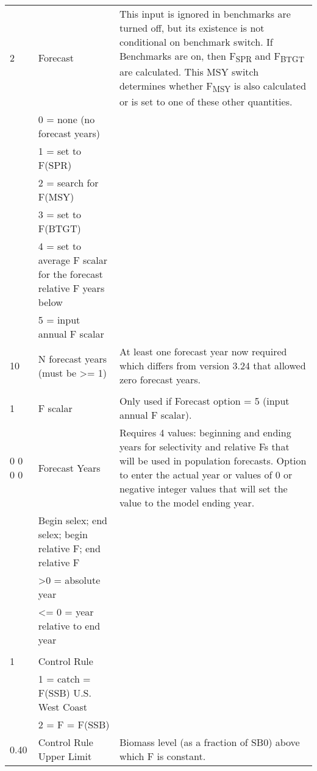\begin{landscape}
\begin{longtable}{p{3cm} p{7cm} p{11cm}}
  \hline
  2 & Forecast & \multirow{1}{1cm}[-0.1cm]{\parbox{11cm }{ This input is ignored in benchmarks are turned off, but its existence is not conditional on benchmark switch.  If Benchmarks are on, then F\textsubscript{SPR} and F\textsubscript{BTGT} are calculated.  This MSY switch determines whether F\textsubscript{MSY} is also calculated or is set to one of these other quantities.}} \\
    & 0 = none (no forecast years) & \\
    & 1 = set to F(SPR) & \\
    & 2 = search for F(MSY) & \\
    & 3 = set to F(BTGT) & \\
    & 4 = set to average F scalar for the forecast relative F years below & \\
    & 5 = input annual F scalar & \\
    
  \hline
  10 & N forecast years (must be >= 1) &  \multirow{1}{1cm}[-0.1cm]{\parbox{11cm }{ At least one forecast year now required which differs from version 3.24 that allowed zero forecast years.}} \\
     & & \\
     
  \hline
  1 & F scalar & \multirow{1}{1cm}[-0.1cm]{\parbox{11cm}{Only used if Forecast option = 5 (input annual F scalar).}}\\
  \pagebreak
  
  0 0 0 0 & Forecast Years &  \multirow{1}{1cm}[-0.1cm]{\parbox{11cm}{Requires 4 values:  beginning and ending years for selectivity and relative Fs that will be used in population forecasts.  Option to enter the actual year or values of 0 or negative integer values that will set the value to the model ending year.}}\\
    & Begin selex; end selex; begin relative F; end relative F & \\
    & >0 = absolute year & \\
    & <= 0 = year relative to end year & \\
    & & \\
  
 \hline   
 1 & Control Rule & \\
   & 1 = catch = F(SSB) U.S. West Coast & \\
   & 2 = F = F(SSB) & \\
   
 \hline
 0.40 & Control Rule Upper Limit & \multirow{1}{1cm}[-0.1cm]{\parbox{11cm}{Biomass level (as a fraction of SB0) above which F is constant.}} \\
 

\end{longtable}
\end{landscape}

